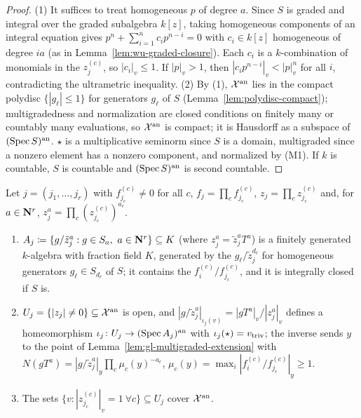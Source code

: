 \begin{proof}
(1) It suffices to treat homogeneous $p$ of degree $a$. Since $S$ is graded and integral over the graded subalgebra $k[z]$,
taking homogeneous components of an integral equation gives $p^n+\sum_{i=1}^nc_ip^{n-i}=0$ with $c_i\in k[z]$ homogeneous of degree
$ia$ (as in Lemma~\ref{lem:wu-graded-closure}). Each $c_i$ is a $k$-combination of monomials in the $z^{(c)}_j$, so $|c_i|_v\le1$. If
$|p|_v>1$, then $|c_ip^{n-i}|_v<|p|_v^n$ for all $i$, contradicting the ultrametric inequality. (2) By (1), $\mathcal X^{\mathrm{an}}$ lies in the
compact polydisc $\{|g_\ell|\le1\}$ for generators $g_\ell$ of $S$ (Lemma~\ref{lem:polydisc-compact}); multigradedness and normalization
are closed conditions on finitely many or countably many evaluations, so $\mathcal X^{\mathrm{an}}$ is compact; it is Hausdorff as a subspace of
$(\operatorname{Spec} S)^{\mathrm{an}}$. $\star$ is a multiplicative seminorm since $S$ is a domain, multigraded since a nonzero element has a nonzero
component, and normalized by (M1). If $k$ is countable, $S$ is countable and $(\operatorname{Spec} S)^{\mathrm{an}}$ is second countable.
\end{proof}

\begin{lemma}\label{lem:gl-charts}
\leanok
{}
Let $j=(j_1,\dots,j_r)$ with $f^{(c)}_{j_c}\ne0$ for all $c$, $f_j=\prod_cf^{(c)}_{j_c}$, $z_j=\prod_cz^{(c)}_{j_c}$ and, for $a\in\mathbf{N}^r$,
$z_j^a=\prod_c(z^{(c)}_{j_c})^{a_c}$.
\begin{enumerate}
\item $A_j\coloneqq\{g/\tilde z_j^a:g\in S_a,\ a\in\mathbf{N}^r\}\subseteq K$ (where $z_j^a=\tilde z_j^aT^a$) is a finitely generated $k$-algebra with
fraction field $K$, generated by the $g_\ell/\tilde z_j^{d_\ell}$ for homogeneous generators $g_\ell\in S_{d_\ell}$ of $S$; it contains the
$f^{(c)}_i/f^{(c)}_{j_c}$, and it is integrally closed if $S$ is.
\item $U_j=\{|z_j|\ne0\}\subseteq\mathcal X^{\mathrm{an}}$ is open, and $|g/\tilde z_j^a|_{\iota_j(v)}=|gT^a|_v/|z_j^a|_v$ defines a homeomorphism
$\iota_j\colon U_j\to(\operatorname{Spec} A_j)^{\mathrm{an}}$ with $\iota_j(\star)=v_{\mathrm{triv}}$; the inverse sends $y$ to the point of
Lemma~\ref{lem:gl-multigraded-extension} with $N(gT^a)=|g/\tilde z_j^a|_y\prod_c\mu_c(y)^{-a_c}$,
$\mu_c(y)=\max_i|f^{(c)}_i/f^{(c)}_{j_c}|_y\ge1$.
\item The sets $\{v:|z^{(c)}_{j_c}|_v=1\ \forall c\}\subseteq U_j$ cover $\mathcal X^{\mathrm{an}}$.
\end{enumerate}
\end{lemma}

